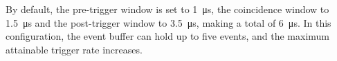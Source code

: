 By default, the pre-trigger window is set to
\SI{1}{\micro\second}, the coincidence window to \SI{1.5}{\micro\second} and the
post-trigger window to \SI{3.5}{\micro\second}, making a total of
\SI{6}{\micro\second}.  In this configuration, the event buffer can hold up to
five events, and the maximum attainable trigger rate increases.
